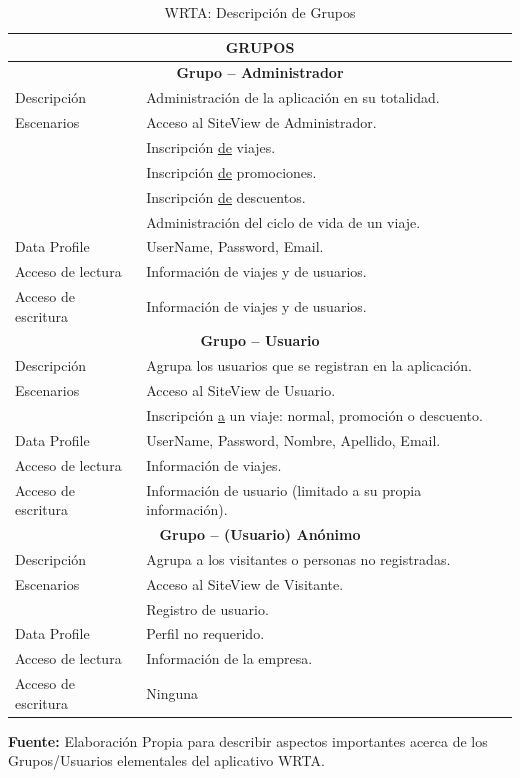 \documentclass[oneside,12pt,a4paper]{memoir}%
\begin{document}
		\begin{table}[htbp]
		\centering
		\caption{WRTA: Descripci\'on de Grupos}
			\begin{tabular}{|l|l|}
				\hline
				\multicolumn{2}{|c|}{\textbf{GRUPOS}} \\\hline
				\multicolumn{2}{|c|}{\textbf{Grupo -- Administrador}} \\\hline
				Descripci\'on		& Administraci\'on de la aplicaci\'on en su totalidad.\\\hline 
				Escenarios			& Acceso al SiteView de Administrador.					\\
									& Inscripci\'on \underline{de} viajes.					\\
									& Inscripci\'on \underline{de} promociones.				\\
									& Inscripci\'on \underline{de} descuentos.				\\
									& Administraci\'on del ciclo de vida de un viaje.		\\\hline
			    Data Profile 		& UserName, Password, Email.							\\\hline 
				Acceso de lectura   & Informaci\'on de viajes y de usuarios.				\\\hline
				Acceso de escritura & Informaci\'on de viajes y de usuarios.				\\\hline
				\multicolumn{2}{|c|}{\textbf{Grupo -- Usuario}} \\\hline
				Descripci\'on 		& Agrupa los usuarios que se registran en la
				aplicaci\'on.\\\hline 
				Escenarios 			& Acceso al SiteView de Usuario.							\\
									& Inscripci\'on \underline{a} un viaje: normal,
									promoci\'on o descuento.								\\\hline 
				Data Profile 		& UserName, Password, Nombre, Apellido, Email.			\\\hline
				Acceso de lectura	& Informaci\'on de viajes.								\\\hline
				Acceso de escritura & Informaci\'on de usuario (limitado a su propia
				informaci\'on). 																\\\hline
				\multicolumn{2}{|c|}{\textbf{Grupo -- (Usuario) An\'onimo}} \\\hline
				Descripci\'on 		& Agrupa a los visitantes o personas no registradas.    \\\hline
				Escenarios 			& Acceso al SiteView de Visitante.						\\
									& Registro de usuario.									\\\hline
				Data Profile 		& Perfil no requerido.									\\\hline 
				Acceso de lectura	& Informaci\'on de la empresa.							\\\hline
				Acceso de escritura & Ninguna												\\\hline
				
			\end{tabular}
			\newline
			\textbf{Fuente:} Elaboraci\'on Propia para describir aspectos
			importantes acerca de los Grupos/Usuarios elementales del aplicativo
			WRTA.
			\label{tab:descriptionTable}
		\end{table}
		
\end{document}
